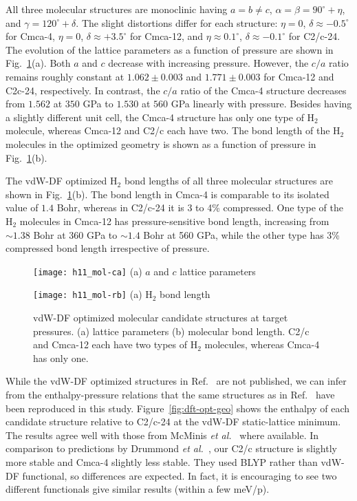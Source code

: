 All three molecular structures are monoclinic having $a=b\neq c$, $\alpha=\beta=90^\circ+\eta$, and $\gamma=120^\circ+\delta$. The slight distortions differ for each structure: $\eta=0$, $\delta\approx -0.5^\circ$ for Cmca-4, $\eta=0$, $\delta\approx+3.5^\circ$ for Cmca-12, and $\eta\approx0.1^\circ$, $\delta\approx-0.1^\circ$ for C2/c-24.
The evolution of the lattice parameters as a function of pressure are shown in Fig.~\ref{fig:hsolid-vdw-ca}(a).
Both $a$ and $c$ decrease with increasing pressure.
However, the $c/a$ ratio remains roughly constant at $1.062\pm0.003$ and $1.771\pm0.003$ for Cmca-12 and C2c-24, respectively.
In contrast, the $c/a$ ratio of the Cmca-4 structure decreases from $1.562$ at $350$ GPa to $1.530$ at $560$ GPa linearly with pressure.
Besides having a slightly different unit cell, the Cmca-4 structure has only one type of H$_2$ molecule, whereas Cmca-12 and C2/c each have two.
The bond length of the H$_2$ molecules in the optimized geometry is shown as a function of pressure in Fig.~\ref{fig:hsolid-vdw-ca}(b).

The vdW-DF optimized H$_2$ bond lengths of all three molecular structures are shown in Fig.~\ref{fig:hsolid-vdw-ca}(b).
The bond length in Cmca-4 is comparable to its isolated value of $1.4$ Bohr, whereas in C2/c-24 it is 3 to 4\% compressed.
One type of the H$_2$ molecules in Cmca-12 has pressure-sensitive bond length, increasing from $\sim 1.38$ Bohr at 360 GPa to $\sim 1.4$ Bohr at 560 GPa, while the other type has 3\% compressed bond length irrespective of pressure.

\begin{figure}[h]
\centering
\begin{minipage}{0.49\textwidth}
\centering
\texttt{[image: h11\_mol-ca]}
(a) $a$ and $c$ lattice parameters
\end{minipage}
\begin{minipage}{0.49\textwidth}
\centering
\texttt{[image: h11\_mol-rb]}
(a) H$_2$ bond length
\end{minipage}
\caption{vdW-DF optimized molecular candidate structures at target pressures. (a) lattice parameters (b) molecular bond length. C2/c and Cmca-12 each have two types of H$_2$ molecules, whereas Cmca-4 has only one.}
\label{fig:hsolid-vdw-ca}
\end{figure}

While the vdW-DF optimized structures in Ref.~\cite{McMinis2015} are not published, we can infer from the enthalpy-pressure relations that the same structures as in Ref.~\cite{McMinis2015} have been reproduced in this study. Figure~\ref{fig:dft-opt-geo} shows the enthalpy of each candidate structure relative to C2/c-24 at the vdW-DF static-lattice minimum. The results agree well with those from McMinis \textit{et al.}~\cite{McMinis2015} where available.
In comparison to predictions by Drummond \textit{et al.}~\cite{Drummond2015}, our C2/c structure is slightly more stable and Cmca-4 slightly less stable.
They used BLYP rather than vdW-DF functional, so differences are expected. In fact, it is encouraging to see two different functionals give similar results (within a few meV/p).

